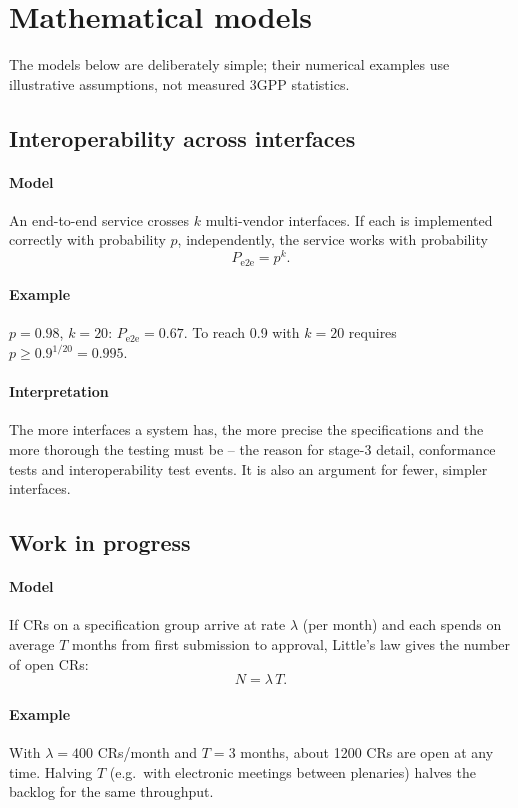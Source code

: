 \documentclass[11pt,a4paper]{article}
\begin{document}
\section{Mathematical models}
The models below are deliberately simple; their numerical examples use illustrative assumptions, not measured
3GPP statistics.

\subsection{Interoperability across interfaces}\label{sec:interop}
\paragraph{Model} An end-to-end service crosses $k$ multi-vendor interfaces. If each is implemented correctly with
probability $p$, independently, the service works with probability
\begin{equation}\label{eq:interop}
  P_{\mathrm{e2e}} = p^{k}.
\end{equation}
\paragraph{Example} $p = 0.98$, $k = 20$: $P_{\mathrm{e2e}} = 0.67$. To reach 0.9 with $k = 20$ requires
$p \ge 0.9^{1/20} = 0.995$.
\paragraph{Interpretation} The more interfaces a system has, the more precise the specifications and the more
thorough the testing must be -- the reason for stage-3 detail, conformance tests and interoperability test events.
It is also an argument for fewer, simpler interfaces.

\subsection{Work in progress}\label{sec:little}
\paragraph{Model} If CRs on a specification group arrive at rate $\lambda$ (per month) and each spends on average $T$
months from first submission to approval, Little's law gives the number of open CRs:
\begin{equation}\label{eq:little}
  N = \lambda\,T .
\end{equation}
\paragraph{Example} With $\lambda = 400$ CRs/month and $T = 3$ months, about 1200 CRs are open at any time. Halving
$T$ (e.g.\ with electronic meetings between plenaries) halves the backlog for the same throughput.
\end{document}
